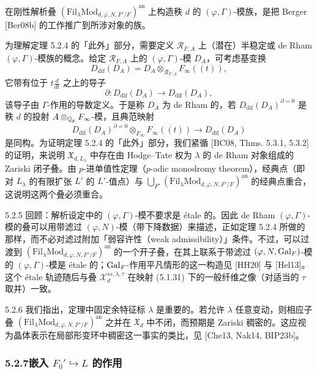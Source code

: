 在刚性解析叠 $(\mathrm{Fil}_\lambda\mathrm{Mod}_{d,\varphi,N,F'/F})^{\mathrm{an}}$ 上构造秩 $d$ 的 $(\varphi,\Gamma)$-模族，是把 Berger [Ber08b] 的工作推广到所涉对象的族。

为理解定理 5.2.4 的「此外」部分，需要定义 $\mathcal{R}_{F,A}$ 上（潜在）半稳定或 de Rham $(\varphi,\Gamma)$-模族的概念。给定 $\mathcal{R}_{F,A}$ 上的 $(\varphi,\Gamma)$-模 $D_A$，可考虑基变换
\[
D_{\mathrm{dif}}(D_A)=D_A\otimes_{\mathcal{R}_{F,A}}F_\infty(\!(t)\!),
\]
它带有位于 $t\frac{d}{dt}$ 之上的导子
\[
\partial: D_{\mathrm{dif}}(D_A)\longrightarrow D_{\mathrm{dif}}(D_A),
\]
该导子由 $\Gamma$-作用的导数定义。于是称 $D_A$ 为 de Rham 的，若 $D_{\mathrm{dif}}(D_A)^{\partial=0}$ 是秩 $d$ 的投射 $A\otimes_{\mathbb{Q}_p}F_\infty$-模，且典范映射
\[
D_{\mathrm{dif}}(D_A)^{\partial=0}\otimes_{F_\infty}F_\infty(\!(t)\!)\longrightarrow D_{\mathrm{dif}}(D_A)
\]
是同构。为证明定理 5.2.4 的「此外」部分，我们紧循 [BC08, Thms. 5.3.1, 5.3.2] 的证明，来说明 $\mathfrak{X}_{d,L_\lambda}$ 中存在由 Hodge--Tate 权为 $\lambda$ 的 de Rham 对象组成的 Zariski 闭子叠。由 $p$-进单值性定理（$p$-adic monodromy theorem），经典点（即对 $L_\lambda$ 的有限扩张 $L'$ 的 $L'$-值点）与 $\bigcup_{F'}(\mathrm{Fil}_\lambda\mathrm{Mod}_{d,\varphi,N,F'/F})^{\mathrm{an}}$ 的经典点重合，这说明这两个叠必须重合。

\begin{rem}{5.2.5}
回顾：解析设定中的 $(\varphi,\Gamma)$-模不要求是 étale 的。因此 de Rham $(\varphi,\Gamma)$-模的叠可以用带滤过 $(\varphi,N)$-模（带下降数据）来描述，正如定理 5.2.4 所做的那样，而不必对滤过附加「弱容许性（weak admissibility）」条件。不过，可以过渡到 $(\mathrm{Fil}_\lambda\mathrm{Mod}_{d,\varphi,N,F'/F})^{\mathrm{an}}$ 的一个开子叠，在其上联系于带滤过 $(\varphi,N,\operatorname{Gal}_F)$-模的 $(\varphi,\Gamma)$-模是 étale 的；$\operatorname{Gal}_F$-作用平凡情形的这一构造见 [HH20] 与 [Hel13]。这个 étale 轨迹随后与叠 $\mathcal{X}^{ss,\lambda,\tau}_d$ 在映射 (5.1.31) 下的一般纤维之像（对适当的 $\tau$ 取并）一致。
\label{thm:a4-5-2-5}
\end{rem}

\begin{rem}{5.2.6}
我们指出，定理中固定余特征标 $\lambda$ 是重要的。若允许 $\lambda$ 任意变动，则相应子叠 $(\mathrm{Fil}_\lambda\mathrm{Mod}_{d,\varphi,N,F'/F})^{\mathrm{an}}$ 之并在 $\mathfrak{X}_d$ 中不闭，而预期是 Zariski 稠密的。这应视为晶体表示在局部形变环中稠密这一事实的类比，见 [Che13, Nak14, BIP23b]。
\label{thm:a4-5-2-6}
\end{rem}

\subsubsection*{5.2.7\quad 嵌入 $F_0'\hookrightarrow L$ 的作用}

